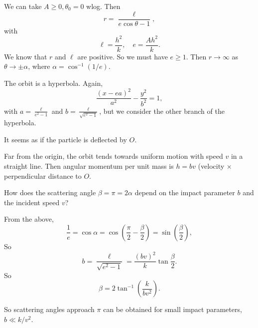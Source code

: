 \documentclass[a4paper]{article}
\begin{document}
We can take $A \geq 0, \theta_0 = 0$ wlog. Then
\[
  r = \frac{\ell}{e\cos \theta - 1},
\]
with
\[
  \ell = \frac{h^2}{k}, \quad e = \frac{Ah^2}{k}.
\]
We know that $r$ and $\ell$ are positive. So we must have $e \geq 1$. Then $r\to \infty$ as $\theta \to \pm \alpha$, where $\alpha = \cos^{-1}(1/e)$.

The orbit is a hyperbola. Again,
\[
  \frac{(x - ea)^2}{a^2} - \frac{y^2}{b^2} = 1,
\]
with $a = \frac{\ell}{e^2 - 1}$ and $b = \frac{\ell}{\sqrt{e^2 - 1}}$, but we consider the other branch of the hyperbola.
\begin{center}
\end{center}
It seems as if the particle is deflected by $O$.

Far from the origin, the orbit tends towards uniform motion with speed $v$ in a straight line. Then angular momentum per unit mass is $h = bv$ (velocity $\times$ perpendicular distance to $O$.

How does the scattering angle $\beta = \pi = 2\alpha$ depend on the impact parameter $b$ and the incident speed $v$?

From the above,
\[
  \frac{1}{e} = \cos \alpha = \cos \left(\frac{\pi}{2} - \frac{\beta}{2}\right) = \sin\left(\frac{\beta}{2}\right),
\]
So
\[
  b = \frac{\ell}{\sqrt{e^2 - 1}} = \frac{(bv)^2}{k}\tan \frac{\beta}{2}.
\]
So
\[
  \beta = 2\tan^{-1}\left(\frac{k}{bv^2}\right).
\]

So scattering angles approach $\pi$ can be obtained for small impact parameters, $b \ll k/v^2$.
\end{document}
